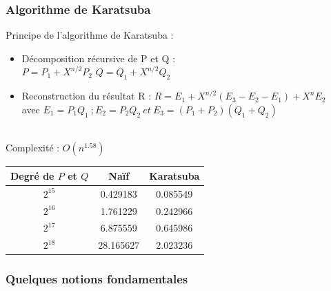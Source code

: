 \documentclass[8pt]{beamer}
\begin{document}
\begin{frame}
\frametitle{Algorithme de Karatsuba}

Principe de l'algorithme de Karatsuba :
\begin{itemize}
    \item Décomposition récursive de P et Q : \\
    $P = P_1 + X^{n/2}P_2$ $Q = Q_1 + X^{n/2}Q_2$
    \item Reconstruction du résultat R :
    $R = E_1+X^{n/2}(E_3-E_2-E_1)+X^n E_2$\\
    avec $E_1 = P_1Q_1\ ; E_2 = P_2Q_2\ et\ E_3 = (P_1+P_2)(Q_1+Q_2)$
\end{itemize}
\ \\[0.2cm]
Complexité : $O(n^{1.58})$ \\[0.5cm]

\begin{center}
\begin{tabular}{||c c c||}
\hline
Degré de $P$ et $Q$ & Naïf & Karatsuba \\
\hline\hline
$2^{15}$ & 0.429183 & 0.085549 \\
\hline
$2^{16}$ & 1.761229 & 0.242966 \\
\hline
$2^{17}$ & 6.875559 & 0.645986 \\
\hline
$2^{18}$ & 28.165627 & 2.023236 \\
\hline
\end{tabular}
\end{center}
{}
\end{frame}

\begin{frame}
\frametitle{Quelques notions fondamentales}

\begin{enumerate}
    
\end{enumerate}

\end{frame}
\end{document}
